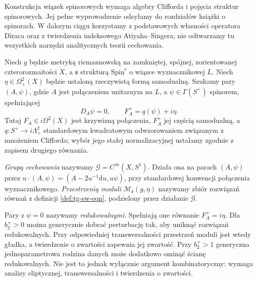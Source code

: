 \begin{uwaga}
Konstrukcja wiązek spinorowych wymaga algebry Clifforda
i pojęcia struktur spinorowych. Jej pełne wyprowadzenie
odsyłamy do rozdziałów książki o spinorach.
W dalszym ciągu korzystamy z podstawowych własności
operatora Diraca oraz z twierdzenia indeksowego
Atiyaha--Singera; nie odtwarzamy tu wszystkich narzędzi
analitycznych teorii cechowania.
\end{uwaga}

\begin{definicja}
\label{def:tg-sw-eqn}
Niech $g$ będzie metryką riemannowską na zamkniętej,
spójnej, zorientowanej czterorozmaitości $X$, a
$\mathfrak s$ strukturą $\mathrm{Spin}^c$ o wiązce
wyznacznikowej $L$. Niech $\eta\in\Omega^2_+(X)$
będzie ustaloną rzeczywistą formą samodualną.
Szukamy pary $(A,\psi)$, gdzie $A$ jest połączeniem
unitarnym na $L$, a $\psi\in\Gamma(S^+)$ spinorem,
spełniającej
\[
D_A\psi=0,\qquad F_A^+=q(\psi)+i\eta.
\]
Tutaj $F_A\in i\Omega^2(X)$ jest krzywizną połączenia,
$F_A^+$ jej częścią samodualną, a
$q:S^+\to i\Lambda^2_+$ standardowym kwadratowym
odwzorowaniem związanym z mnożeniem Clifforda;
wybór jego stałej normalizacyjnej ustalamy zgodnie
z zapisem drugiego równania.
\end{definicja}

\begin{definicja}
\emph{Grupą cechowania} nazywamy
$\mathcal G=C^\infty(X,S^1)$.
Działa ona na parach $(A,\psi)$ przez
$u\cdot(A,\psi)=(A-2u^{-1}\mathrm du,u\psi)$,
przy standardowej konwencji połączenia wyznacznikowego.
\emph{Przestrzenią moduli} $\mathcal M_{\mathfrak s}(g,\eta)$
nazywamy zbiór rozwiązań równań z definicji
\ref{def:tg-sw-eqn}, podzielony przez działanie $\mathcal G$.
\end{definicja}

\begin{uwaga}
Pary z $\psi=0$ nazywamy \emph{redukowalnymi}.
Spełniają one równanie $F_A^+=i\eta$.
Dla $b_2^+>0$ można generycznie dobrać perturbację
tak, aby uniknąć rozwiązań redukowalnych. Przy odpowiedniej
transwersalności przestrzeń moduli jest wtedy gładka,
a twierdzenie o zwartości zapewnia jej zwartość.
Przy $b_2^+>1$ generyczna jednoparametrowa rodzina danych
może dodatkowo ominąć ścianę redukowalnych. Nie jest to jednak wyłącznie argument
kombinatoryczny: wymaga analizy eliptycznej, transwersalności
i twierdzenia o zwartości.
\end{uwaga}

